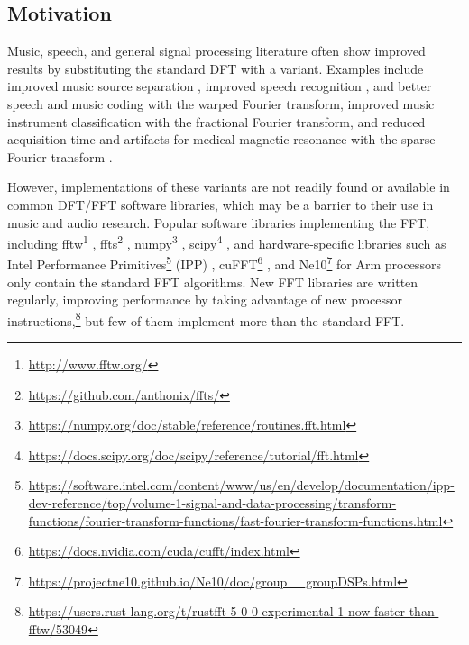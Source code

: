 \documentclass[letter,12pt,notitlepage]{article}
\begin{document}
\subsection{Motivation}

Music, speech, and general signal processing literature often show improved results by substituting the standard DFT with a variant. Examples include improved music source separation \cite{betterbss}, improved speech recognition \cite{bettermfcc}, and better speech and music coding \cite{warpedcomparison} with the warped Fourier transform, improved music instrument classification \cite{betterfractional} with the fractional Fourier transform, and reduced acquisition time and artifacts for medical magnetic resonance with the sparse Fourier transform \cite{bettersparse}.

However, implementations of these variants are not readily found or available in common DFT/FFT software libraries, which may be a barrier to their use in music and audio research. Popular software libraries implementing the FFT, including fftw\footnote{\href{http://www.fftw.org/}{http://www.fftw.org/}} \cite{fftw}, ffts\footnote{\href{https://github.com/anthonix/ffts/}{https://github.com/anthonix/ffts/}} \cite{ffts}, numpy\footnote{\href{https://numpy.org/doc/stable/reference/routines.fft.html}{https://numpy.org/doc/stable/reference/routines.fft.html}} \cite{numpy}, scipy\footnote{\href{https://docs.scipy.org/doc/scipy/reference/tutorial/fft.html}{https://docs.scipy.org/doc/scipy/reference/tutorial/fft.html}} \cite{scipy}, and hardware-specific libraries such as Intel Performance Primitives\footnote{\href{https://software.intel.com/content/www/us/en/develop/documentation/ipp-dev-reference/top/volume-1-signal-and-data-processing/transform-functions/fourier-transform-functions/fast-fourier-transform-functions.html}{https://software.intel.com/content/www/us/en/develop/documentation/ipp-dev-reference/top/volume-1-signal-and-data-processing/transform-functions/fourier-transform-functions/fast-fourier-transform-functions.html}} (IPP) \cite{ipp}, cuFFT\footnote{\href{https://docs.nvidia.com/cuda/cufft/index.html}{https://docs.nvidia.com/cuda/cufft/index.html}} \cite{cufft}, and Ne10\footnote{\href{https://projectne10.github.io/Ne10/doc/group__groupDSPs.html}{https://projectne10.github.io/Ne10/doc/group\_\_groupDSPs.html}} for Arm processors \cite{ne10} only contain the standard FFT algorithms. New FFT libraries are written regularly, improving performance by taking advantage of new processor instructions,\footnote{\href{https://users.rust-lang.org/t/rustfft-5-0-0-experimental-1-now-faster-than-fftw/53049}{https://users.rust-lang.org/t/rustfft-5-0-0-experimental-1-now-faster-than-fftw/53049}} but few of them implement more than the standard FFT.
\end{document}

